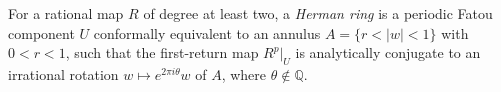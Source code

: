 
For a rational map $R$ of degree at least two, a \emph{Herman ring} is a periodic Fatou component $U$ conformally equivalent to an annulus $A=\{r<|w|<1\}$ with $0<r<1$, such that the first-return map $R^p|_U$ is analytically conjugate to an irrational rotation $w\mapsto e^{2\pi i\theta}w$ of $A$, where $\theta\notin\mathbb Q$.

